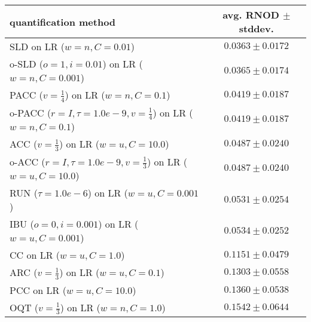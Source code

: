 \begin{tabular}{lc}
  \toprule
  quantification method & avg. RNOD $\pm$ stddev. \\
  \midrule
  SLD on LR ($w=n, C=0.01$) & $\mathbf{0.0363 \pm 0.0172}$ \\
  o-SLD ($o=1, i=0.01$) on LR ($w=n, C=0.001$) & $\mathbf{0.0365 \pm 0.0174}$ \\
  PACC ($v=\frac{1}{4}$) on LR ($w=n, C=0.1$) & $0.0419 \pm 0.0187$ \\
  o-PACC ($r=I, \tau=1.0e-9, v=\frac{1}{4}$) on LR ($w=n, C=0.1$) & $0.0419 \pm 0.0187$ \\
  ACC ($v=\frac{1}{3}$) on LR ($w=u, C=10.0$) & $0.0487 \pm 0.0240$ \\
  o-ACC ($r=I, \tau=1.0e-9, v=\frac{1}{3}$) on LR ($w=u, C=10.0$) & $0.0487 \pm 0.0240$ \\
  RUN ($\tau=1.0e-6$) on LR ($w=u, C=0.001$) & $0.0531 \pm 0.0254$ \\
  IBU ($o=0, i=0.001$) on LR ($w=u, C=0.001$) & $0.0534 \pm 0.0252$ \\
  CC on LR ($w=u, C=1.0$) & $0.1151 \pm 0.0479$ \\
  ARC ($v=\frac{1}{3}$) on LR ($w=u, C=0.1$) & $0.1303 \pm 0.0558$ \\
  PCC on LR ($w=u, C=10.0$) & $0.1360 \pm 0.0538$ \\
  OQT ($v=\frac{1}{3}$) on LR ($w=n, C=1.0$) & $0.1542 \pm 0.0644$ \\
  \bottomrule
\end{tabular}
